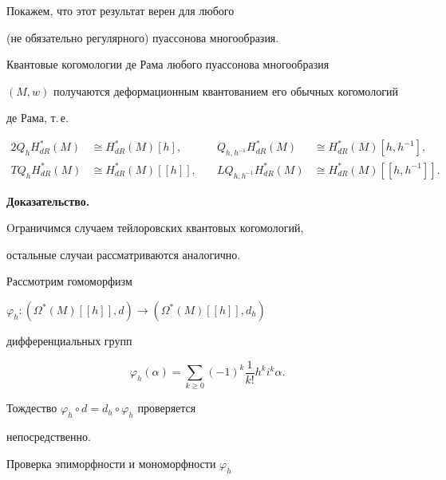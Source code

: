 Покажем, что этот результат верен для любого


(не обязательно регулярного) пуассонова многообразия.








\begin{thms}


Квантовые когомологии де Рама любого пуассонова многообразия


$(M,w)$ получаются деформационным квантованием его обычных когомологий


де Рама, т.\,е.


\begin{alignat*}{2}


Q_h H^*_{dR}(M)&\cong H^*_{dR}(M)[h], &\quad


Q_{h,h^{-1}} H^*_{dR}(M)&\cong H^*_{dR}(M)[h,h^{-1}],\\


T Q_h H^*_{dR}(M)&\cong H^*_{dR}(M)[[h]], &\quad


L Q_{h,h^{-1}} H^*_{dR}(M)&\cong H^*_{dR}(M)[[h,h^{-1}]].


\end{alignat*}


\end{thms}








{\bf Доказательство.}


Oграничимся случаем тейлоровских квантовых когомологий, 


остальные случаи рассматриваются аналогично.





Рассмотрим гомоморфизм


$\varphi_h :(\Omega^*(M)[[h]],d)\to (\Omega^*(M)[[h]],d_h)$


дифференциальных групп


$$


\varphi_h(\alpha)=\sum_{k\ge0}(-1)^k\frac1{k!}h^ki^k\alpha.


$$





Тождество $\varphi_h\circ d=d_h\circ \varphi_h$ проверяется


непосредственно.


Проверка эпиморфности и мономорфности $\varphi_h$


